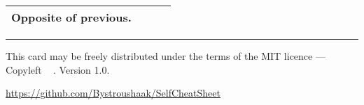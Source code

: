 \documentclass[10pt]{article}
\begin{document}
\begin{multicols*}{3}
{\begin{tabular}{ p{70pt} p{140pt} l l }
Opposite of previous.

\\\hline %

\end{tabular}
}




\vfill \hrule\smallskip

{\small
This card may be freely distributed under
the terms of the MIT licence ---
Copyleft \textcopyleft\ \thedate{} \href{http://kitakitsune.org}{\theauthor}. Version 1.0.

\url{https://github.com/Bystroushaak/SelfCheatSheet}
}

\end{multicols*}
\end{document}
